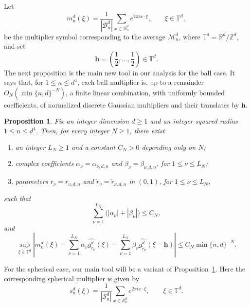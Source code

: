 \documentclass{article}
\theoremstyle{plain}
\newtheorem{proposition}[theorem]{Proposition}
\numberwithin{equation}{section}
\begin{document}
Let
\[
 m_n^d(\xi)
 =\frac1{|\mathcal B_n^d|}
 \sum_{x\in\mathcal B_n^d}e^{2\pi ix\cdot\xi},\qquad \xi\in\mathbb T^d,
\]
be the multiplier symbol corresponding to the average $\mathcal M_n^d$, where $\mathbb T^d=\mathbb R^d/\mathbb Z^d$, and set
\[
 \mathbf h=\left(\frac12,\ldots,\frac12\right)\in\mathbb T^d.
\]
The next proposition is the main new tool in our analysis for the ball case. It says that, for $1\leq n\leq d^4$,
each ball multiplier is, up to a remainder
\(O_{N}(\min\{n,d\}^{-N})\), a finite linear combination, with uniformly bounded coefficients, of normalized
discrete Gaussian multipliers and their translates by
\(\mathbf h\).
\begin{proposition}\label{prop:euclidean-Gaussian-approximation}
Fix an integer dimension $d\geq 1$ and an integer squared radius $1\leq n\leq d^4$. Then, for every integer \(N\geq 1\), there exist
\begin{enumerate}
\item an integer \(L_N\geq 1\) and a constant $C_N>0$ depending only on $N$;
\item complex coefficients
\(\alpha_{\nu}=\alpha_{\nu,d,n}\) and \(\beta_{\nu}=\beta_{\nu,d,n}\), for \(1\leq\nu\leq L_N\);
\item parameters
\(r_{\nu}=r_{\nu,d,n}\) and \(\widetilde r_{\nu}=\widetilde r_{\nu,d,n}\) in $(0,1)$, for \(1\leq\nu\leq L_N\),
\end{enumerate}
such that
\begin{equation}\label{eq:euclidean-Gaussian-coefficients}
 \sum_{\nu=1}^{L_N}
 \bigl(|\alpha_{\nu}|+|\beta_{\nu}|\bigr)
 \leq C_{N},
\end{equation}
and
\begin{equation}\label{eq:euclidean-multiplier-remainder}
 \sup_{\xi\in\mathbb T^d}\left|m_n^d(\xi)-\sum_{\nu=1}^{L_N}\alpha_{\nu}\widehat{g_{r_{\nu}}^d}(\xi)
 -\sum_{\nu=1}^{L_N}\beta_{\nu}
 \widehat{g_{\widetilde r_{\nu}}^d}(\xi-\mathbf h)\right|
 \leq C_{N}\min\{n,d\}^{-N}.
\end{equation}
\end{proposition}

For the spherical case, our main tool will be a variant of Proposition~\ref{prop:euclidean-Gaussian-approximation}. Here the corresponding spherical multiplier is given by
\[
 s_n^d(\xi)
 =\frac1{|\mathcal S_n^d|}
 \sum_{x\in\mathcal S_n^d}e^{2\pi ix\cdot\xi},\qquad \xi\in\mathbb T^d.
\]
\end{document}
